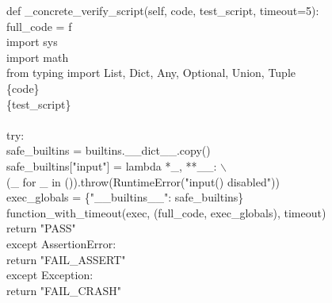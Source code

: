 \documentclass[11pt]{article}
\begin{document}
\begin{codebox}[title={\textcolor{white}{[L] Live Execution Wrapper}}, colframe=LiveColor!80!black, colback=LiveColor!5!white, boxed title style={colback=LiveColor!80!black}]
\small\ttfamily
def \_concrete\_verify\_script(self, code, test\_script, timeout=5):\\
\hspace*{1em}full\_code = f\textquotedbl\textquotedbl\textquotedbl\\
\hspace*{1em}import sys\\
\hspace*{1em}import math\\
\hspace*{1em}from typing import List, Dict, Any, Optional, Union, Tuple\\[0.3em]
\hspace*{1em}\{code\}\\[0.3em]
\hspace*{1em}\{test\_script\}\\
\hspace*{1em}\textquotedbl\textquotedbl\textquotedbl\\
\hspace*{1em}try:\\
\hspace*{2em}safe\_builtins = builtins.\_\_dict\_\_.copy()\\
\hspace*{2em}safe\_builtins["input"] = lambda *\_, **\_\_: $\backslash$\\
\hspace*{3em}(\_ for \_ in ()).throw(RuntimeError("input() disabled"))\\
\hspace*{2em}exec\_globals = \{"\_\_builtins\_\_": safe\_builtins\}\\
\hspace*{2em}function\_with\_timeout(exec, (full\_code, exec\_globals), timeout)\\
\hspace*{2em}return "PASS"\\
\hspace*{1em}except AssertionError:\\
\hspace*{2em}return "FAIL\_ASSERT"\\
\hspace*{1em}except Exception:\\
\hspace*{2em}return "FAIL\_CRASH"
\end{codebox}
\end{document}
